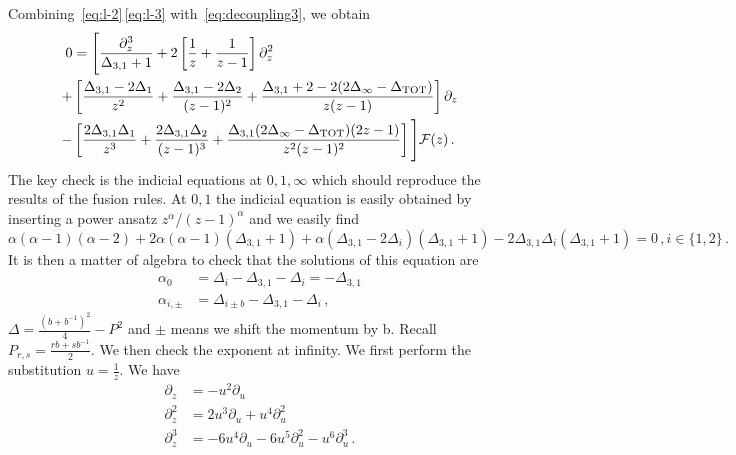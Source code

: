 \documentclass[11pt]{article}
\begin{document}
Combining~\eqref{eq:l-2}\,\eqref{eq:l-3} with~\eqref{eq:decoupling3}, we obtain
\begin{equation}
  \begin{aligned}
    0 &= \Bigg[\frac{\partial_z^3}{\Delta_{3,1}+1} + 2 \left[\frac{1}{z}+\frac{1}{z-1}\right]\partial^2_z \\
    +&\left[\frac{\Delta_{3,1}-2\Delta_1}{z^2} + \frac{\Delta_{3,1}-2\Delta_2}{(z-1)^2}+\frac{\Delta_{3,1}+2-2(2\Delta_{\infty}-\Delta_{\rm TOT})}{z(z-1)}\right]\partial_z \\
    -&\left[\frac{2\Delta_{3,1}\Delta_1}{z^3}+\frac{2\Delta_{3,1}\Delta_2}{(z-1)^3}+\frac{\Delta_{3,1}(2\Delta_{\infty}-\Delta_{\rm TOT})(2z-1)}{z^2(z-1)^2}\right]
    \Bigg] \mathcal{F}(z)\,.
  \end{aligned}
\end{equation}
The key check is the indicial equations at $0,1,\infty$ which should reproduce the results of the fusion rules. At $0,1$ the indicial equation is easily obtained by inserting a power ansatz $z^\alpha$/$(z-1)^\alpha$ and we easily find
\begin{equation}
  \alpha(\alpha-1)(\alpha-2)+2\alpha(\alpha-1)(\Delta_{3,1}+1)+\alpha(\Delta_{3,1}-2\Delta_i)(\Delta_{3,1}+1)-2\Delta_{3,1}\Delta_i(\Delta_{3,1}+1)=0\,,i\in\{1,2\}\,.
\end{equation}
It is then a matter of algebra to check that the solutions of this equation are
\begin{equation}
  \begin{aligned}
    \alpha_{0} &= \Delta_{i} - \Delta_{3,1} - \Delta_{i} = -\Delta_{3,1} \\
    \alpha_{i , \pm} &= \Delta_{i \pm b} - \Delta_{3,1} - \Delta_{i}\,,
  \end{aligned}
\end{equation}
$\Delta = \frac{(b+b^{-1})^2}{4}-P^2$ and $\pm$ means we shift the momentum by b. Recall $P_{r,s} = \frac{rb+sb^{-1}}{2}$. We then check the exponent at infinity. We first perform the substitution $u=\frac{1}{z}$. We have
\begin{equation}
\begin{aligned}
   \partial_z &= -u^2 \partial_u \\
   \partial_z^2 &= 2u^3 \partial_u +u^4 \partial_u^2 \\
   \partial_z^3 &= -6u^4 \partial_u -6u^5 \partial^2_u -u^6 \partial_u^3\,.\\
\end{aligned}
\end{equation}
\end{document}
